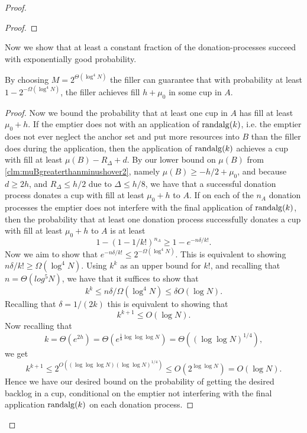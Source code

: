 \begin{proof}
\begin{proof}
\end{proof}

Now we show that at least a constant fraction of the
donation-processes succeed with exponentially good probability.
\begin{clm}
  \label{clm:baseChernoffBound}
  By choosing $M = 2^{\Theta(\log^4 N)}$ the filler can guarantee that with
  probability at least $1-2^{-\Omega(\log^4 N)}$, the filler achieves
  fill $h+\mu_0$ in some cup in $A$. 
\end{clm}
\begin{proof}
Now we bound the probability that at least one cup in $A$ has
fill at least $\mu_0 + h$. If the emptier does not
 with an application of $\operatorname{\text{\textup{randalg}}}(k)$, i.e. the
emptier does not ever neglect the anchor set and put more resources
into $B$ than the filler does during the application, then the
application of $\operatorname{\text{\textup{randalg}}}(k)$ achieves a cup with fill at least
$\mu(B) - R_\Delta + d$. By our lower bound
on $\mu(B)$ from \cref{clm:muBgreaterthanminushover2}, namely
$\mu(B) \ge -h/2 + \mu_0$, and because $d\ge 2h$, and $R_\Delta
\le h/2$ due to $\Delta \le h/8$, we have that a successful
donation process donates a cup with fill at least $\mu_0 + h$ to
$A$. If on each of the $n_A$ donation processes the emptier does
not interfere with the final application of $\operatorname{\text{\textup{randalg}}}(k)$, then 
the probability that at least one donation process successfully
donates a cup with fill at least $\mu_0 + h$ to $A$ is at least 
$$1-(1-1/k!)^{n_A} \ge 1-e^{- n\delta/k!}.$$
Now we aim to show that $e^{-n \delta/k!} \le 2^{-\Omega(\log^4 N)}$.
This is equivalent to showing $n\delta/k! \ge \Omega(\log^4 N)$.
Using $k^k$ as an upper bound for $k!$, and recalling that
$n=\Theta(log^5 N)$, we have that it suffices to show that 
$$k^k \le n\delta / \Omega(\log^4 N) \le \delta O(\log N).$$
Recalling that $\delta = 1/(2k)$ this is equivalent to showing
that
$$k^{k+1} \le O(\log N).$$
Now recalling that 
$$k = \Theta(e^{2h}) = \Theta(e^{\frac{1}{8}\log\log\log N}) =
\Theta((\log\log N)^{1/4}),$$ 
we get 
$$k^{k+1} \le 2^{O((\log\log\log N)(\log\log N)^{1/4})} \le
O(2^{\log\log N}) = O(\log N).$$
Hence we have our desired bound on the probability of getting the
desired backlog in a cup, conditional on the emptier not
interfering with the final application $\operatorname{\text{\textup{randalg}}}(k)$ on each
donation process.


\end{proof}
\end{proof}
